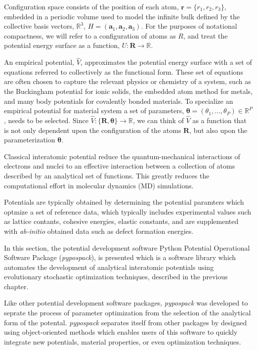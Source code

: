 Configuration space consists of the position of each atom, $\bm{r}=\{r_1,r_2,r_3\}$, embedded in a periodic volume used to model the infinite bulk defined by the collective basis vectors, $\mathbb{R}^3$, $H=(\bm{a}_1,\bm{a}_2,\bm{a}_3)$.
For the purposes of notational compactness, we will refer to a configuration of atoms as $R$, and treat the potential energy surface as a function, $U:\bm{R}\rightarrow\mathbb{R}$.

An empirical potential, $\hat{V}$, approximates the potential energy surface with a set of equations referred to collectively as the functional form.  
These set of equations are often chosen to capture the relevant physics or chemistry of a system, such as the Buckingham potential for ionic solids, the embedded atom method for metals, and many body potentials for covalently bonded materials.  
To specialize an empirical potential for material system a set of parameters, $\bm{\theta}=(\theta_1,...,\theta_P)\in\mathbb{R}^P$, needs to be selected.  
Since $\hat{V}:\{\bm{R},\bm{\theta}\}\rightarrow\mathbb{R}$, we can think of $\hat{V}$ as a function that is not only dependent upon the configuration of the atoms $\bm{R}$, but also upon the parameterization $\bm{\theta}$.

Classical interatomic potential reduce the quantum-mechanical interactions of electrons and nuclei to an effective interaction between a collection of atoms described by an analytical set of functions.
This greatly reduces the computational effort in molecular dynamics (MD) simulations.

Potentials are typically obtained by determining the potential paramters which optmize a set of reference data, which typically includes experimental values such as lattice contants, cohesive energies, elastic constants, and are supplemented with \emph{ab-initio} obtained data such as defect formation energies.

In this section, the potential development software Python Potential Operational Software Package (\emph{pypospack}), is presented which is a software library which automates the development of analytical interatomic potentials using evolutionary stochastic optimization techniques, described in the previous chapter.

Like other potential development software packages, \emph{pypospack} was developed to seprate the process of parameter optimization from the selection of the analytical form of the potental.  \emph{pypospack} separates itself from other packages by designed using object-oriented methods which enables users of this software to quickly integrate new potentials, material properties, or even optimization techniques.

